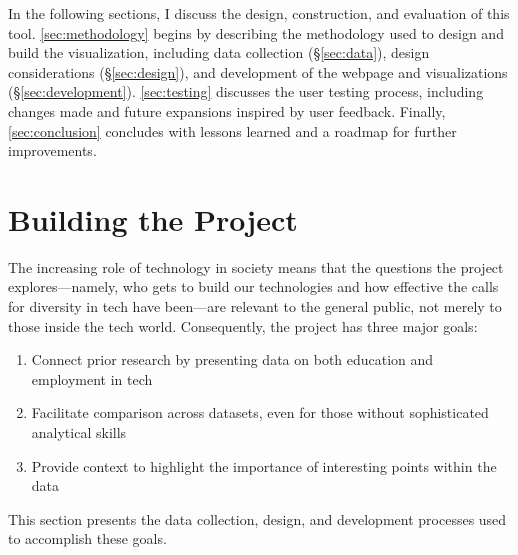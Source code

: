 \documentclass{article}
\newcommand{\bigmargins}{\vspace*{0.5in}}
\begin{document}
In the following sections, I discuss the design, construction, and evaluation of this tool. \autoref{sec:methodology} begins by describing the methodology used to design and build the visualization, including data collection (\S\ref{sec:data}), design considerations (\S\ref{sec:design}), and development of the webpage and visualizations (\S\ref{sec:development}). \autoref{sec:testing} discusses the user testing process, including changes made and future expansions inspired by user feedback. Finally, \autoref{sec:conclusion} concludes with lessons learned and a roadmap for further improvements.


\section{Building the Project}\label{sec:methodology}
The increasing role of technology in society means that the questions the project explores---namely, who gets to build our technologies and how effective the calls for diversity in tech have been---are relevant to the general public, not merely to those inside the tech world. Consequently, the project has three major goals:
\begin{enumerate}
  \item Connect prior research by presenting data on both education and employment in tech
  \item Facilitate comparison across datasets, even for those without sophisticated analytical skills
  \item Provide context to highlight the importance of interesting points within the data
\end{enumerate}

This section presents the data collection, design, and development processes used to accomplish these goals.










\clearpage
\bigmargins


\end{document}
